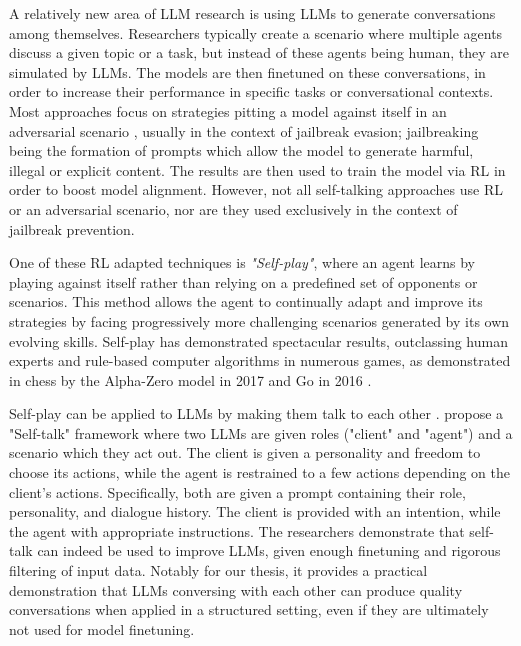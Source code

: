 A relatively new area of LLM research is using LLMs to generate conversations among themselves. Researchers typically create a scenario where multiple agents discuss a given topic or a task, but instead of these agents being human, they are simulated by LLMs. The models are then finetuned on these conversations, in order to increase their performance in specific tasks or conversational contexts. Most approaches focus on strategies pitting a model against itself in an adversarial scenario \cite{liu2024largelanguagemodelsagents, cheng2024selfplayingadversariallanguagegame, zheng2024optimalllmalignmentsusing}, usually in the context of jailbreak evasion; jailbreaking being the formation of prompts which allow the model to generate harmful, illegal or explicit content. The results are then used to train the model via \ac{RL} in order to boost model alignment. However, not all self-talking approaches use \ac{RL} or an adversarial scenario, nor are they used exclusively in the context of jailbreak prevention.

One of these \ac{RL} adapted techniques is \textit{"Self-play"}, where an agent learns by playing against itself rather than relying on a predefined set of opponents or scenarios. This method allows the agent to continually adapt and improve its strategies by facing progressively more challenging scenarios generated by its own evolving skills. Self-play has demonstrated spectacular results, outclassing human experts and rule-based computer algorithms in numerous games, as demonstrated in chess by the Alpha-Zero model in 2017 \cite{silver2017masteringchessshogiselfplay} and Go in 2016 \cite{vincent_2019_ai_go}. 

Self-play can be applied to LLMs by making them talk to each other \cite{cheng2024selfplayingadversariallanguagegame}.  \citet{ulmer2024bootstrappingllmbasedtaskorienteddialogue} propose a "Self-talk" framework where two LLMs are given roles ("client" and "agent") and a scenario which they act out. The client is given a personality and freedom to choose its actions, while the agent is restrained to a few actions depending on the client's actions. Specifically, both are given a prompt containing their role, personality, and dialogue history. The client is provided with an intention, while the agent with appropriate instructions. The researchers demonstrate that self-talk can indeed be used to improve LLMs, given enough finetuning and rigorous filtering of input data. Notably for our thesis, it provides a practical demonstration that LLMs conversing with each other can produce quality conversations when applied in a structured setting, even if they are ultimately not used for model finetuning.

